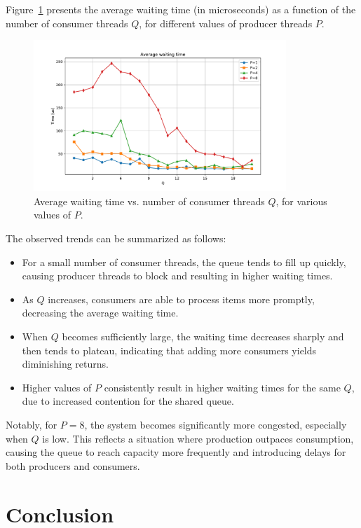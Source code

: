 \documentclass[11pt]{article}
\begin{document}
Figure~\ref{fig:avg_waiting_time} presents the average waiting time (in microseconds) as a function 
of the number of consumer threads \( Q \), for different values of producer threads \( P \).

\begin{figure}[H]
    \centering
    \includegraphics[width=0.85\textwidth]{figure.pdf}
    \caption{Average waiting time vs. number of consumer threads \( Q \), for various values of \( P \).}
    \label{fig:avg_waiting_time}
\end{figure}

The observed trends can be summarized as follows:
\begin{itemize}
    \item For a small number of consumer threads, the queue tends to fill up quickly, causing producer 
    threads to block and resulting in higher waiting times.
    \item As \( Q \) increases, consumers are able to process items more promptly, decreasing the 
    average waiting time.
    \item When \( Q \) becomes sufficiently large, the waiting time decreases sharply and then tends 
    to plateau, indicating that adding more consumers yields diminishing returns.
    \item Higher values of \( P \) consistently result in higher waiting times for the same \( Q \), 
    due to increased contention for the shared queue.
\end{itemize}

Notably, for \( P = 8 \), the system becomes significantly more congested, especially when \( Q \) is low. 
This reflects a situation where production outpaces consumption, causing the queue to reach capacity more 
frequently and introducing delays for both producers and consumers.

\section{Conclusion}
\end{document}
